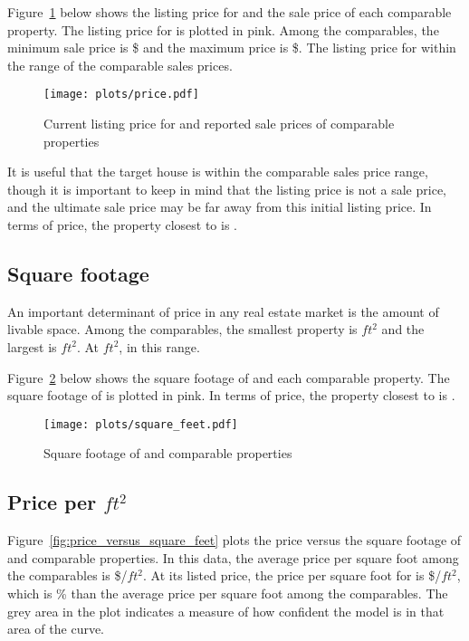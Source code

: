 \documentclass[
12pt, %
letterpaper, %
oneside, %
headinclude,footinclude, %
BCOR5mm, %
]{scrartcl}
\begin{document}
Figure~\ref{fig:price} below shows the listing price for \textbf{\PropertyName{}} and the sale price of each comparable property.
The listing price for \PropertyName{} is plotted in pink. 
Among the comparables, the minimum sale price is \$\MinPrice{} and the maximum price is \$\MaxPrice{}.
The listing price for \PropertyName{} \InPriceRange{} within the range of the comparable sales prices. 

\begin{figure}[htb]
\centering
\caption{Current listing price for \PropertyName{} and reported sale prices of comparable properties} 
\label{fig:price}  
\texttt{[image: plots/price.pdf]} 
\end{figure}

It is useful that the target house is within the comparable sales price range, though it is important to keep in mind that the listing price is not a sale price, and the ultimate sale price may be far away from this initial listing price.
In terms of price, the property closest to \PropertyName{} is \ClosestOnPrice{}. 

\subsection{Square footage}
An important determinant of price in any real estate market is the amount of livable space.
Among the comparables, the smallest property is \MinSize{}$ft^2$ and the largest is \MaxSize{}$ft^2$.
At \PropertySize{}$ft^2$, \PropertyName{} \InSizeRange{} in this range. 

Figure~\ref{fig:square_feet} below shows the square footage of \PropertyName{} and each comparable property.
The square footage of \PropertyName{} is plotted in pink. 
In terms of price, the property closest to \PropertyName{} is \ClosestOnSize{}.

\begin{figure}[h!]
\centering
\caption{Square footage of \PropertyName{} and comparable properties} \label{fig:square_feet}  
\texttt{[image: plots/square\_feet.pdf]} 
\end{figure}

\subsection{Price per $ft^2$}

Figure~\ref{fig:price_versus_square_feet} plots the price versus the square footage of \PropertyName{} and comparable properties.
In this data, the average price per square foot among the comparables is \$\MeanPricePerFoot{}/$ft^2$.
At its listed price, the price per square foot for \PropertyName{} is \$\MeanPricePerFootFocal{}/$ft^2$,
which is \MeanPricePerFootPct{}\% \ComparePricePerFoot{} than the average price per square foot among the comparables.
The grey area in the plot indicates a measure of how confident the model is in that area of the curve. 
\end{document}
